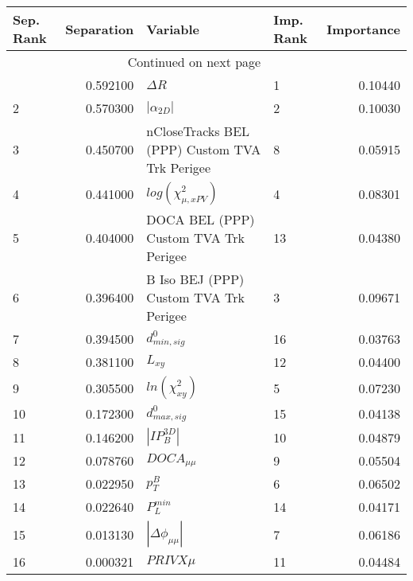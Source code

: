 \usepackage{lscape}

\begin{landscape}
\begin{longtable}{lrllr}
\toprule
Sep. Rank &  Separation &                                       Variable & Imp. Rank &  Importance \\
\midrule
\endhead
\midrule
\multicolumn{3}{r}{{Continued on next page}} \\
\midrule
\endfoot

\bottomrule
\endlastfoot
        1 &    0.592100 &                                     $\Delta R$ &         1 &     0.10440 \\
        2 &    0.570300 &                                $|\alpha_{2D}|$ &         2 &     0.10030 \\
        3 &    0.450700 &  nCloseTracks BEL (PPP) Custom TVA Trk Perigee &         8 &     0.05915 \\
        4 &    0.441000 &                      $log(\chi^{2}_{\mu,xPV})$ &         4 &     0.08301 \\
        5 &    0.404000 &          DOCA BEL (PPP) Custom TVA Trk Perigee &        13 &     0.04380 \\
        6 &    0.396400 &         B Iso BEJ (PPP) Custom TVA Trk Perigee &         3 &     0.09671 \\
        7 &    0.394500 &                               $d^0_{min, sig}$ &        16 &     0.03763 \\
        8 &    0.381100 &                                       $L_{xy}$ &        12 &     0.04400 \\
        9 &    0.305500 &                            $ln(\chi^{2}_{xy})$ &         5 &     0.07230 \\
       10 &    0.172300 &                               $d^0_{max, sig}$ &        15 &     0.04138 \\
       11 &    0.146200 &                                $|IP_{B}^{3D}|$ &        10 &     0.04879 \\
       12 &    0.078760 &                                $DOCA_{\mu\mu}$ &         9 &     0.05504 \\
       13 &    0.022950 &                                      $p^B_{T}$ &         6 &     0.06502 \\
       14 &    0.022640 &                                  $P^{min}_{L}$ &        14 &     0.04171 \\
       15 &    0.013130 &                       $|\Delta \phi_{\mu\mu}|$ &         7 &     0.06186 \\
       16 &    0.000321 &                                     $PRIVX\mu$ &        11 &     0.04484 \\
\end{longtable}

\end{landscape}
